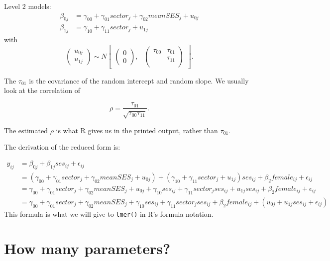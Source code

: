 \documentclass[
  letterpaper,
  DIV=11,
  numbers=noendperiod]{scrreprt}
\begin{document}
Level 2 models: \[
\begin{aligned}
\beta_{0j} &= \gamma_{00} + \gamma_{01} sector_j + \gamma_{02} meanSES_j + u_{0j} \\
\beta_{1j} &= \gamma_{10} + \gamma_{11} sector_j + u_{1j} 
\end{aligned}
\] with \[
\begin{pmatrix} u_{0j} \\
u_{1j}
\end{pmatrix} \sim  N
\begin{bmatrix}
\begin{pmatrix}
0 \\
0
\end{pmatrix}\!\!,&
\begin{pmatrix}
\tau_{00} & \tau_{01}\\
 & \tau_{11} \\
\end{pmatrix}
\end{bmatrix} .
\]

The \(\tau_{01}\) is the covariance of the random intercept and random
slope. We usually look at the correlation of

\[ \rho = \frac{ \tau_{01} }{ \sqrt{ \tau_{00} \tau_{11} } } . \]

The estimated \(\rho\) is what R gives us in the printed output, rather
than \(\tau_{01}\).

The derivation of the reduced form is:

\[
\begin{aligned}
y_{ij} &= \beta_{0j} + \beta_{1j} ses_{ij} + \epsilon_{ij}\\
&= \left( \gamma_{00} + \gamma_{01} sector_j + \gamma_{02} meanSES_j + u_{0j} \right)+ (\gamma_{10} + \gamma_{11} sector_j + u_{1j}) ses_{ij} + \beta_2 female_{ij} + \epsilon_{ij} \\
&= \gamma_{00} + \gamma_{01} sector_j + \gamma_{02} meanSES_j  + u_{0j}  + \gamma_{10}ses_{ij} + \gamma_{11} sector_j ses_{ij} + u_{1j} ses_{ij} + \beta_2 female_{ij} +  \epsilon_{ij}  \\
&= \gamma_{00} + \gamma_{01} sector_j + \gamma_{02} meanSES_j +  \gamma_{10}ses_{ij} + \gamma_{11} sector_j ses_{ij} + \beta_2 female_{ij}  + \left(u_{0j} + u_{1j} ses_{ij} + \epsilon_{ij} \right) 
\end{aligned}
\] This formula is what we will give to \texttt{lmer()} in R's formula
notation.

\section{How many parameters?}\label{how-many-parameters}
\end{document}
